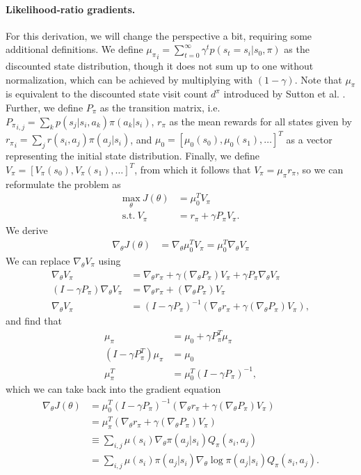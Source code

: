 \paragraph{Likelihood-ratio gradients.} 
For this derivation, we will change the perspective a bit, requiring some additional definitions. 
We define ${\mu_\pi}_i = \sum_{t=0}^{\infty} \gamma^t p(s_t=s_i | s_0, \pi)$ \cite{puterman2014markov} as the discounted state distribution, though it does not sum up to one without normalization, which can be achieved by multiplying with $(1-\gamma)$. 
Note that $\mu_\pi$ is equivalent to the discounted state visit count $d^\pi$ introduced by Sutton et al. \cite{Sutton:1999:PGM:3009657.3009806}.
Further, we define $P_\pi$ as the transition matrix, i.e. ${P_\pi}_{i,j}=\sum\nolimits_k p(s_j|s_i,a_k)\pi(a_k|s_i)$, $r_\pi$ as the mean rewards for all states given by ${r_\pi}_i = \sum_j r(s_i,a_j)\pi(a_j|s_i)$, and $\mu_0 = \left[\mu_0(s_0),\mu_0(s_1),\ldots\right]^T$ as a vector representing the initial state distribution.
Finally, we define $V_\pi = \left[ V_\pi(s_0), V_\pi(s_1), \ldots \right]^T$, from which it follows that $V_\pi = \mu_\pi r_\pi$, so we can reformulate the problem as 
\begin{align}
	\underset{\theta}{\text{max}}\ J(\theta) &= \mu_0^T V_\pi \\
	\text{s.t.}\ V_\pi &= r_\pi + \gamma P_\pi V_\pi . \nonumber
\end{align}
We derive 
\begin{align*}
	\nabla_\theta J(\theta) &= \nabla_\theta \mu_0^T V_\pi = \mu_0^T \nabla_\theta V_\pi
\end{align*}
We can replace $\nabla_\theta V_\pi$ using
\begin{align*}
	\nabla_\theta V_\pi &= \nabla_\theta r_\pi + \gamma (\nabla_\theta P_\pi) V_\pi + \gamma P_\pi \nabla_\theta V_\pi
	\\ (I-\gamma P_\pi) \nabla_\theta V_\pi &= \nabla_\theta r_\pi + (\nabla_\theta P_\pi) V_\pi
	\\ \nabla_\theta V_\pi &= (I - \gamma P_\pi)^{-1} (\nabla_\theta r_\pi + \gamma (\nabla_\theta P_\pi) V_\pi), 
\end{align*}
and find that
\begin{align*}
	\mu_\pi &= \mu_0 + \gamma P_\pi^T \mu_\pi \nonumber \\
	(I- \gamma P_\pi^T)\mu_\pi &= \mu_0 \nonumber \\
	\mu_\pi^T &= \mu_0^T (I- \gamma P_\pi)^{-1} ,
\end{align*}
which we can take back into the gradient equation 
\begin{align}
	\nabla_\theta J(\theta) &= \mu_0^T (I - \gamma P_\pi)^{-1} (\nabla_\theta r_\pi + \gamma (\nabla_\theta P_\pi) V_\pi) \nonumber
	\\ &= \mu_\pi^T (\nabla_\theta r_\pi + \gamma (\nabla_\theta P_\pi) V_\pi) \nonumber
	\\ &\equiv \sum\nolimits_{i,j} \mu(s_i) \nabla_\theta\pi(a_j|s_i) Q_\pi(s_i,a_j) \label{eqn:likelihood-equiv}
	\\ &= \sum\nolimits_{i,j} \mu(s_i) \pi(a_j|s_i) \nabla_\theta\log\pi(a_j|s_i) Q_\pi(s_i,a_j). \nonumber
\end{align}

